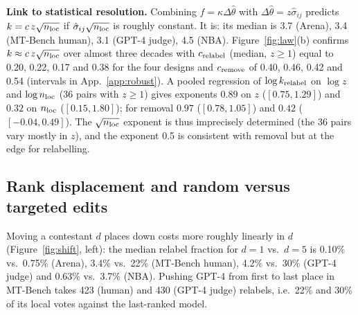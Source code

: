\documentclass{article}
\newcommand{\nloc}{n_{\rm loc}}
\newcommand{\thh}{\hat\theta}
\begin{document}
\textbf{Link to statistical resolution.} Combining $f=\kappa\Delta\thh$ with $\Delta\thh=z\hat\sigma_{ij}$ predicts $k=c\,z\sqrt{\nloc}$ if $\hat\sigma_{ij}\sqrt{\nloc}$ is roughly constant. It is: its median is 3.7 (Arena), 3.4 (MT-Bench human), 3.1 (GPT-4 judge), 4.5 (NBA). Figure~\ref{fig:law}(b) confirms $k\approx c\,z\sqrt{\nloc}$ over almost three decades with $c_{\rm relabel}$ (median, $z\geq1$) equal to 0.20, 0.22, 0.17 and 0.38 for the four designs and $c_{\rm remove}$ of 0.40, 0.46, 0.42 and 0.54 (intervals in App.~\ref{app:robust}). A pooled regression of $\log k_{\rm relabel}$ on $\log z$ and $\log\nloc$ (36 pairs with $z\geq1$) gives exponents $0.89$ on $z$ ($[0.75,1.29]$) and $0.32$ on $\nloc$ ($[0.15,1.80]$); for removal $0.97$ ($[0.78,1.05]$) and $0.42$ ($[-0.04,0.49]$). The $\sqrt{\nloc}$ exponent is thus imprecisely determined (the 36 pairs vary mostly in $z$), and the exponent 0.5 is consistent with removal but at the edge for relabelling.

\subsection{Rank displacement and random versus targeted edits}
Moving a contestant $d$ places down costs more roughly linearly in $d$ (Figure~\ref{fig:shift}, left): the median relabel fraction for $d=1$ vs.\ $d=5$ is 0.10\% vs.\ 0.75\% (Arena), 3.4\% vs.\ 22\% (MT-Bench human), 4.2\% vs.\ 30\% (GPT-4 judge) and 0.63\% vs.\ 3.7\% (NBA). Pushing GPT-4 from first to last place in MT-Bench takes 423 (human) and 430 (GPT-4 judge) relabels, i.e.\ 22\% and 30\% of its local votes against the last-ranked model.
\end{document}
